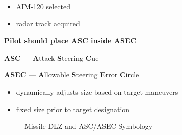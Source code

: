 \begin{tcoloritemize}
{\begin{subitemize}
        \begin{itemize}
            \item AIM-120 selected
            \item radar track acquired
        \end{itemize}
        \item \textbf{Pilot should place ASC inside ASEC}
        \item \textbf{ASC} --- \textbf{A}ttack \textbf{S}teering \textbf{C}ue
        \item \textbf{ASEC} --- \textbf{A}llowable \textbf{S}teering \textbf{E}rror \textbf{C}ircle
        \begin{itemize}
            \item dynamically adjusts size based on target maneuvers
            \item fixed size prior to target designation
        \end{itemize}
    \end{subitemize}}
\end{tcoloritemize}

\clearpage

\begin{figure}[htbp]
    \centering
    \caption{Missile DLZ and ASC/ASEC Symbology}
\end{figure}

